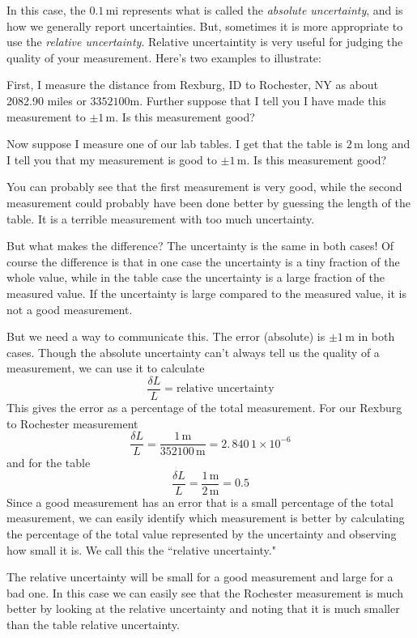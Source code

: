 \documentclass[twoside,11pt,ShortChapTitles]{BYUTextbook}
\begin{document}
In this case, the $0.1\, \text{mi}$ represents what is called the {\em absolute uncertainty}, and is how we generally report uncertainties.  But, sometimes it is more appropriate to use the {\em relative uncertainty}.  Relative uncertaintity is very useful for judging the quality of your measurement. Here's two examples to illustrate:

First, I measure the distance from Rexburg, ID to Rochester, NY as about
2082.90 miles or $3352100 \text{m}$. Further suppose that I tell you I have made this measurement to $\pm1\,\text{m}$. Is this measurement good?

Now suppose I measure one of our lab tables. I get that the table is  $2\,\text{m}$ long and I tell you that my measurement is good to $\pm1\,\text{m} . $ Is this measurement good?

You can probably see that the first measurement is very good, while the second
measurement could probably have been done better by guessing the length of the
table. It is a terrible measurement with too much uncertainty.

But what makes the difference? The uncertainty is the same in both cases! Of
course the difference is that in one case the uncertainty is a tiny fraction
of the whole value, while in the table case the uncertainty is a large
fraction of the measured value. If the uncertainty is large compared to the
measured value, it is not a good measurement.

But we need a way to communicate this. The error (absolute) is  $\pm1\,\text{m}$
in both cases. Though the
absolute uncertainty can't always tell us the quality of a measurement, we can
use it to calculate
\[
\frac{\delta L}{L}=\text{relative uncertainty}
\]
This gives the error as a percentage of the total measurement. For our Rexburg
to Rochester measurement
\[
\frac{\delta L}{L}=\frac{1\,\text{m} }{352100\,\text{m} }=\allowbreak2.\,\allowbreak840\,1\times10^{-6}
\]
and for the table
\[
\frac{\delta L}{L}=\frac{1\,\text{m} }{2\,\text{m} }=0.5
\]
Since a good measurement has an error that is a small percentage of the total
measurement, we can easily identify which measurement is better by calculating
the percentage of the total value represented by the uncertainty and observing
how small it is. We call this the ``relative
uncertainty." 

The relative uncertainty will be small for a good measurement and large for
a bad one. In this case we can easily see that the Rochester measurement is
much better by looking at the relative uncertainty and noting that it is much
smaller than the table relative uncertainty.
\end{document}
